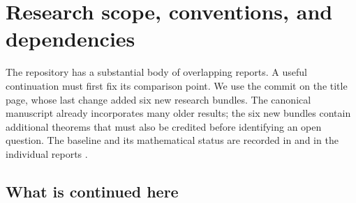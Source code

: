 \documentclass[11pt,letterpaper]{article}
\numberwithin{equation}{section}
\theoremstyle{plain}
\theoremstyle{definition}
\theoremstyle{remark}
\begin{document}
\begin{abstract}
This continuation develops four related methods for exact identities.
First, a fourth-order Bernoulli operator proves that the first $q$
centered harmonic-tail moments have full formal rank for every even pair
$p=q-4\ge2$. The remaining boundary determinant is controlled by a
strict ratio-monotonicity argument, not by extrapolating finite ranks.
Second, every finite late-moment combination for arbitrary positive even
orders admits an explicit polynomial-tail telescoping certificate.
Its negative even Laurent coefficients are exactly the zeta coordinates;
cancellation of the positive zeta coordinates gives a rational
evaluation. Third, the Euler variational derivative yields an exact
three-variable equation for the complete $\psi,\psi',\psi''$ sector of
the inverse-Gamma hierarchy. We solve the square and cube sectors in
closed form and give rational coefficient formulas at every order.
Fourth, the next rank-two Gamma-weight resonance is evaluated with all
cutoff and spectral counterterms retained, producing polylogarithmic
generating functions and convergent zeta evaluations. A final Mellin
calculation relates higher spectral derivatives to explicitly subtracted
logarithmic spatial integrals and Stieltjes coefficients. The report
specifies the inherited results, the new proof scopes, integration
recommendations, and further research targets.
\end{abstract}
\tableofcontents
\clearpage
{}
\section{Research scope, conventions, and dependencies}
\label{sec:scope}

The repository has a substantial body of overlapping reports. A useful
continuation must first fix its comparison point. We use the commit on
the title page, whose last change added six new research bundles.
The canonical manuscript already incorporates many older results;
the six new bundles contain additional theorems that must also be
credited before identifying an open question. The baseline and its
mathematical status are recorded in \cite{Repo,Incoming} and in the
individual reports \cite{BTD,CTD,DHR,DPL,MR,PTI}.

\subsection{What is continued here}
\end{document}
